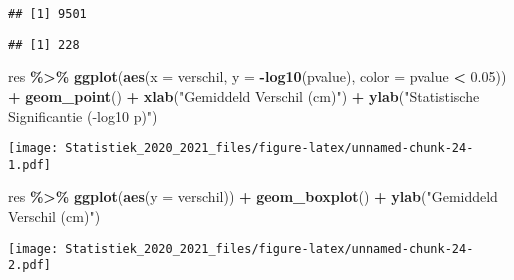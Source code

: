 \documentclass[
  12pt,dutch,coursenotes]{book}
\newenvironment{Shaded}{\begin{snugshade}}{\end{snugshade}}
\newcommand{\DataTypeTok}[1]{\textcolor[rgb]{0.13,0.29,0.53}{#1}}
\newcommand{\DecValTok}[1]{\textcolor[rgb]{0.00,0.00,0.81}{#1}}
\newcommand{\FloatTok}[1]{\textcolor[rgb]{0.00,0.00,0.81}{#1}}
\newcommand{\KeywordTok}[1]{\textcolor[rgb]{0.13,0.29,0.53}{\textbf{#1}}}
\newcommand{\NormalTok}[1]{#1}
\newcommand{\OperatorTok}[1]{\textcolor[rgb]{0.81,0.36,0.00}{\textbf{#1}}}
\newcommand{\StringTok}[1]{\textcolor[rgb]{0.31,0.60,0.02}{#1}}
\theoremstyle{definition}
\theoremstyle{definition}
\theoremstyle{definition}
\theoremstyle{remark}
\begin{document}
\begin{verbatim}
## [1] 9501
\end{verbatim}

\begin{Shaded}
\end{Shaded}

\begin{verbatim}
## [1] 228
\end{verbatim}

\begin{Shaded}
\begin{Highlighting}[]
\NormalTok{res }\OperatorTok{\%\textgreater{}\%}\StringTok{ }\KeywordTok{ggplot}\NormalTok{(}\KeywordTok{aes}\NormalTok{(}\DataTypeTok{x =}\NormalTok{ verschil, }\DataTypeTok{y =} \OperatorTok{{-}}\KeywordTok{log10}\NormalTok{(pvalue), }
    \DataTypeTok{color =}\NormalTok{ pvalue }\OperatorTok{\textless{}}\StringTok{ }\FloatTok{0.05}\NormalTok{)) }\OperatorTok{+}\StringTok{ }\KeywordTok{geom\_point}\NormalTok{() }\OperatorTok{+}\StringTok{ }\KeywordTok{xlab}\NormalTok{(}\StringTok{"Gemiddeld Verschil (cm)"}\NormalTok{) }\OperatorTok{+}\StringTok{ }
\StringTok{    }\KeywordTok{ylab}\NormalTok{(}\StringTok{"Statistische Significantie ({-}log10 p)"}\NormalTok{)}
\end{Highlighting}
\end{Shaded}

\texttt{[image: Statistiek\_2020\_2021\_files/figure-latex/unnamed-chunk-24-1.pdf]}

\begin{Shaded}
\begin{Highlighting}[]
\NormalTok{res }\OperatorTok{\%\textgreater{}\%}\StringTok{ }\KeywordTok{ggplot}\NormalTok{(}\KeywordTok{aes}\NormalTok{(}\DataTypeTok{y =}\NormalTok{ verschil)) }\OperatorTok{+}\StringTok{ }\KeywordTok{geom\_boxplot}\NormalTok{() }\OperatorTok{+}\StringTok{ }
\StringTok{    }\KeywordTok{ylab}\NormalTok{(}\StringTok{"Gemiddeld Verschil (cm)"}\NormalTok{)}
\end{Highlighting}
\end{Shaded}

\texttt{[image: Statistiek\_2020\_2021\_files/figure-latex/unnamed-chunk-24-2.pdf]}
\end{document}
